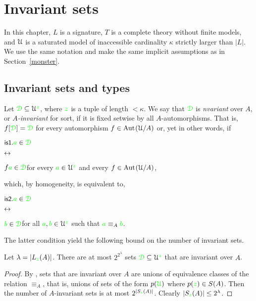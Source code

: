 \chapter{Invariant sets}
\label{invariant}

\def\medrel#1{\parbox[t]{5ex}{$\displaystyle\hfil #1$}}
\def\ceq#1#2#3{\parbox[t]{14ex}{$\displaystyle #1$}\medrel{#2}{$\displaystyle #3$}}

In this chapter, $L$ is a signature, $T$ is a complete theory without finite models, and $\EuScript U$ is a saturated model of inaccessible cardinality $\kappa$ strictly larger than $|L|$.
We use the same notation and make the same implicit assumptions as in Section~\ref{monster}.

\section{Invariant sets and types}\label{invariant_sets}

Let ${\color{green}\EuScript D}\subseteq\EuScript U^{\color{green} z}$, where ${\color{green} z}$ is a tuple of length $<\kappa$.
We say that ${\color{green}\EuScript D}$ is \emph{nvariant\/} over $A$, or \emph{$A$-invariant\/} for sort, if it is fixed setwise by all $A$-automorphisms.
That is, $f[{\color{green}\EuScript D}]={\color{green}\EuScript D}$ for every automorphism $f\in{\rm Aut\kern.15ex}(\EuScript U/A)$ or, yet in other words, if

\ceq{\ssf{is1.}\hfill {\gr a}\in\grD}{\iff}{f{\gr a}\in\grD}\hfill for every ${\color{green} a}\in\EuScript U^{\color{green} z}$ and every $f\in{\rm Aut\kern.15ex}(\EuScript U/A)$,

which, by homogeneity, is equivalent to,

\ceq{\ssf{is2.}\hfill {\gr a}\in\grD}{\iff}{{\gr b}\in\grD}\hfill for all ${\color{green} a},{\color{green} b}\in\EuScript U^{\color{green} z}$ such that ${\color{green} a}\equiv_A{\color{green} b}$.

The latter condition yield the following bound on the number of invariant sets.

\begin{proposition}\label{prop_numberIS}
Let $\lambda=|L_{\color{green} z}(A)|$.
There are at most $2^{2^{\lambda}}$ sets ${\color{green}\EuScript D}\subseteq\EuScript U^{\color{green} z}$ that are invariant over $A$.
\end{proposition}
\begin{proof}
By , sets that are invariant over $A$ are unions of equivalence classes of the relation $\equiv_A$, that is, unions of sets of the form $p({\color{green}\EuScript U})$ where $p({\color{green} z})\in S(A)$.
Then the number of $A$-invariant sets is at most $2^{|S_{\color{green} z}(A)|}$.
Clearly $|S_{\color{green} z}(A)|\le 2^\lambda$.
\end{proof} 

